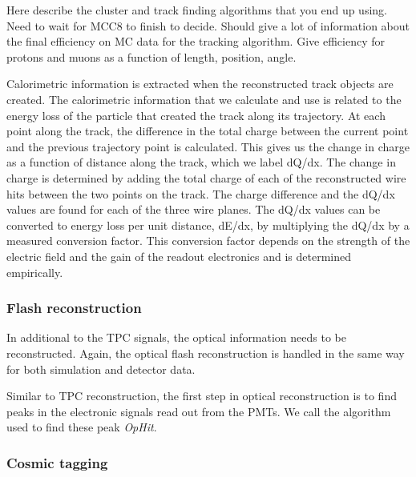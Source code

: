     Here describe the cluster and track finding algorithms that you end up
    using. Need to wait for MCC8 to finish to decide. Should give a lot of
    information about the final efficiency on MC data for the tracking
    algorithm. Give efficiency for protons and muons as a function of length,
    position, angle.

    Calorimetric information is extracted when the reconstructed track objects
    are created. The calorimetric information that we calculate and use is
    related to the energy loss of the particle that created the track along its
    trajectory. At each point along the track, the difference in the total
    charge between the current point and the previous trajectory point is
    calculated. This gives us the change in charge as a function of distance
    along the track, which we label dQ/dx. The change in charge is determined
    by adding the total charge of each of the reconstructed wire hits between
    the two points on the track. The charge difference and the dQ/dx values are
    found for each of the three wire planes. The dQ/dx values can be converted
    to energy loss per unit distance, dE/dx, by multiplying the dQ/dx by a
    measured conversion factor. This conversion factor depends on the strength
    of the electric field and the gain of the readout electronics and is
    determined empirically. 

  \subsubsection{Flash reconstruction}

    In additional to the TPC signals, the optical information needs to be
    reconstructed. Again, the optical flash reconstruction is handled in the
    same way for both simulation and detector data.

    Similar to TPC reconstruction, the first step in optical reconstruction is
    to find peaks in the electronic signals read out from the PMTs. We call the
    algorithm used to find these peak \textit{OpHit}. 

  \subsubsection{Cosmic tagging}


